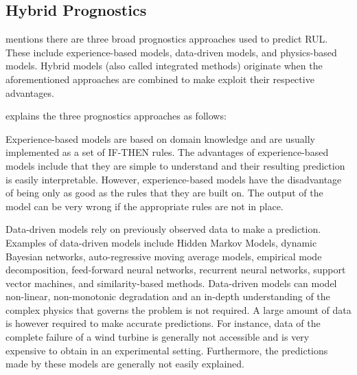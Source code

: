 \subsection{Hybrid Prognostics}




\cite{Liao2014} mentions there are three broad prognostics approaches used to predict RUL. These include experience-based models, data-driven models, and physics-based models. Hybrid models (also called integrated methods) originate when the aforementioned approaches are combined to make exploit their respective advantages.

\cite{Liao2014} explains the three prognostics approaches as follows:

Experience-based models are based on domain knowledge and are usually implemented as a set of IF-THEN rules. The advantages of experience-based models include that they are simple to understand and their resulting prediction is easily interpretable. However, experience-based models have the disadvantage of being only as good as the rules that they are built on. The output of the model can be very wrong if the appropriate rules are not in place. 

Data-driven models rely on previously observed data to make a prediction. Examples of data-driven models include Hidden Markov Models, dynamic Bayesian networks, auto-regressive moving average models, empirical mode decomposition, feed-forward neural networks, recurrent neural networks, support vector machines, and similarity-based methods. Data-driven models can model non-linear, non-monotonic degradation and an in-depth understanding of the complex physics that governs the problem is not required. A large amount of data is however required to make accurate predictions. For instance, data of the complete failure of a wind turbine is generally not accessible and is very expensive to obtain in an experimental setting. Furthermore, the predictions made by these models are generally not easily explained.  

